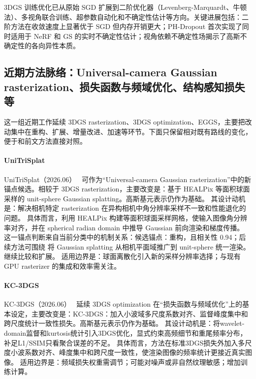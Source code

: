 \begin{takeaway}
3DGS 训练优化已从原始 SGD 扩展到二阶优化器（Levenberg-Marquardt、牛顿法）、多视角联合训练、超参数自动化和不确定性估计等方向。关键进展包括：二阶方法在收敛速度上显著优于 SGD 但内存开销更大；PH-Dropout 首次实现了同时适用于 NeRF 和 GS 的实时不确定性估计；视角依赖不确定性场揭示了高斯不确定性的各向异性本质。
\end{takeaway}


\subsection{近期方法脉络：Universal-camera Gaussian rasterization、损失函数与频域优化、结构感知损失等}

这一组近期工作延续 3DGS rasterization、3DGS optimization、EGGS，主要把改动集中在重构、扩展、增量改进、加速等环节。下面只保留相对既有路线的变化，便于和前文方法直接对照。

\paragraph{UniTriSplat}
UniTriSplat（2026.06）~\cite{2606_29794} 可作为“Universal-camera Gaussian rasterization”中的新锚点候选。相较于 3DGS rasterization，主要改变是：基于 HEALPix 等面积球面采样的 unit-sphere Gaussian splatting。高斯基元表示仍作为基础。
其设计动机是：解决相机特定 rasterization 在异构相机中角分辨率采样不一致和性能退化的问题。
具体而言，利用 HEALPix 构建等面积球面采样网格，使输入图像角分辨率对齐，并在 spherical radian domain 中推导 Gaussian 前向渲染和梯度传播。
这一锚点判断来自当前分类中的机制关系：候选锚点：重构，且相关性 0.94；后续方法可围绕 将 Gaussian splatting 从相机平面域推广到 unit-sphere 统一渲染。 继续比较和扩展。
适用边界是：球面离散化引入新的采样分辨率选择；与现有 GPU rasterizer 的集成和效率需关注。

\paragraph{KC-3DGS}
KC-3DGS（2026.06）~\cite{2606_03120} 延续 3DGS optimization 在“损失函数与频域优化”上的基本设定，主要改变是：KC-3DGS：加入小波域多尺度系数对齐、监督峰度集中和跨尺度统计一致性损失。高斯基元表示仍作为基础。
其设计动机是：将wavelet-domain监督和kurtosis统计引入3DGS优化，显式约束高频细节和重尾频率分布，补足L1/SSIM只看聚合误差的不足。
具体而言，方法在标准3DGS损失外加入多尺度小波系数对齐、峰度集中和跨尺度一致性，使渲染图像的频率统计更接近真实图像。
适用边界是：频域损失权重需调节；可能对噪声或非自然纹理敏感；增加训练计算。

